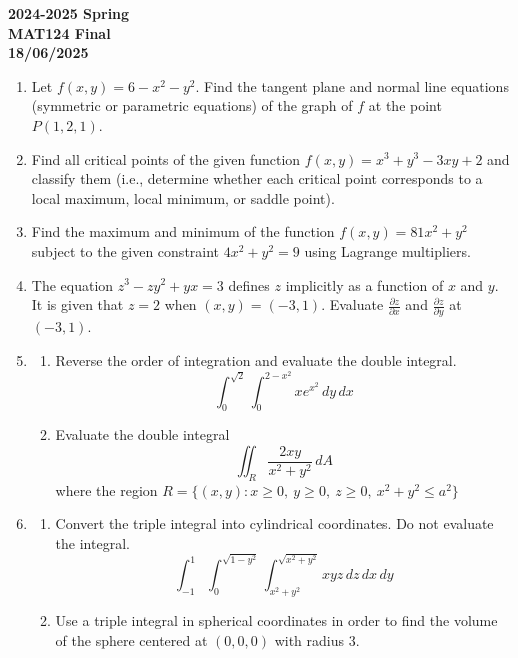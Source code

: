 \documentclass[a4paper, 12pt]{article}
\begin{document}
\pagestyle{empty}

\begin{center}
\textbf{2024-2025 Spring \\MAT124 Final\\18/06/2025}
\end{center}

\begin{enumerate}[leftmargin=*,label=\textbf{\arabic*.}]
\item Let $f(x,y)=6-x^2-y^2$. Find the tangent plane and normal line equations (symmetric or parametric equations) of the graph of $f$ at the point $P(1,2,1)$.

\item Find all critical points of the given function $f(x,y)=x^3+y^3-3xy+2$ and classify them (i.e., determine whether each critical point corresponds to a local maximum, local minimum, or saddle point).

\item Find the maximum and minimum of the function $f(x,y)=81x^2+y^2$ subject to the given constraint $4x^2+y^2=9$ using Lagrange multipliers.

\item The equation $z^3-zy^2+yx=3$ defines $z$ implicitly as a function of $x$ and $y$. It is given that $z=2$ when $(x,y)=(-3,1)$. Evaluate $\displaystyle\frac{\partial z}{\partial x}$ and $\displaystyle\frac{\partial z}{\partial y}$ at $(-3,1)$.

\item \begin{enumerate}[leftmargin=*,label=\textbf{\alph*.}]
\item Reverse the order of integration and evaluate the double integral.
\[\int_0^{\sqrt2}\int_0^{2-x^2}x{e}^{x^2}\,dy\,dx\]
 
\item Evaluate the double integral
\[\iint_R \frac{2xy}{x^2+y^2}\,dA\]
where the region $R = \{(x,y): x\geq0,\:y\geq0,\:z\geq0,\:x^2+y^2\leq a^2\}$
\end{enumerate}

\item \begin{enumerate}[leftmargin=*,label=\textbf{\alph*.}]
\item Convert the triple integral into cylindrical coordinates. Do not evaluate the integral.
\[\int_{-1}^1\int_0^{\sqrt{1-y^2}}\int_{x^2+y^2}^{\sqrt{x^2+y^2}}xyz\,dz\,dx\,dy\]

\item Use a triple integral in spherical coordinates in order to find the volume of the sphere centered at $(0,0,0)$ with radius $3$.
\end{enumerate}


\end{enumerate}
\end{document}
